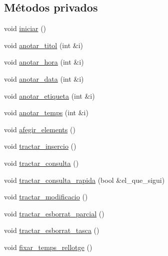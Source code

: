\subsection*{Métodos privados}
\begin{DoxyCompactItemize}
\item 
void \hyperlink{class_comanda_a57a4df9cbf2f41ebbd36270f867e8694}{iniciar} ()
\item 
void \hyperlink{class_comanda_a97ba2fd8c8b5a6d8007efdbfbbcb3fae}{anotar\-\_\-titol} (int \&i)
\item 
void \hyperlink{class_comanda_a0a5bbe87d1bc18bb46b303d167c1794a}{anotar\-\_\-hora} (int \&i)
\item 
void \hyperlink{class_comanda_a77134aa747d804e8d62aba6f2e443eec}{anotar\-\_\-data} (int \&i)
\item 
void \hyperlink{class_comanda_acd79aaef42e1df67426e92b588c793f6}{anotar\-\_\-etiqueta} (int \&i)
\item 
void \hyperlink{class_comanda_a32cf8807dce80ccd10b23d3c420be570}{anotar\-\_\-temps} (int \&i)
\item 
void \hyperlink{class_comanda_a6394f34d947899ee711c598ad65882c5}{afegir\-\_\-elements} ()
\item 
void \hyperlink{class_comanda_a2d6b1de1d935c3441b854165a30b6992}{tractar\-\_\-insercio} ()
\item 
void \hyperlink{class_comanda_afdfd9d24c135a173a87e3f6a406358d7}{tractar\-\_\-consulta} ()
\item 
void \hyperlink{class_comanda_ae431b547161b575907fb0a093b0741bb}{tractar\-\_\-consulta\-\_\-rapida} (bool \&el\-\_\-que\-\_\-sigui)
\item 
void \hyperlink{class_comanda_ad217f019b2d65827a0dba40729311cff}{tractar\-\_\-modificacio} ()
\item 
void \hyperlink{class_comanda_a6b70b1eafbfc69798994a5c23d3885b9}{tractar\-\_\-esborrat\-\_\-parcial} ()
\item 
void \hyperlink{class_comanda_ac453d63201eed34d7c0570e257e6bee4}{tractar\-\_\-esborrat\-\_\-tasca} ()
\item 
void \hyperlink{class_comanda_a421912bd32984118974509a8620f8923}{fixar\-\_\-temps\-\_\-rellotge} ()
\end{DoxyCompactItemize}
